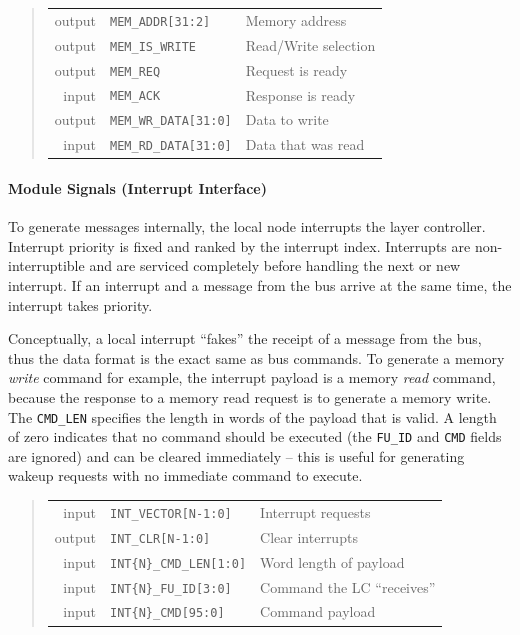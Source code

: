 \begin{quote}
\begin{tabular}{r l l}
  {\sc output} & {\tt MEM\_ADDR[31:2]} & Memory address \\
  {\sc output} & {\tt MEM\_IS\_WRITE} & Read/Write selection \\
  {\sc output} & {\tt MEM\_REQ} & Request is ready \\
  {\sc  input} & {\tt MEM\_ACK} & Response is ready \\
  {\sc output} & {\tt MEM\_WR\_DATA[31:0]} & Data to write \\
  {\sc  input} & {\tt MEM\_RD\_DATA[31:0]} & Data that was read \\
\end{tabular}
\end{quote}

\paragraph{Module Signals (Interrupt Interface)}
To generate messages internally, the local node interrupts the layer
controller. Interrupt priority is fixed and ranked by the interrupt index.
Interrupts are non-interruptible and are serviced completely before handling
the next or new interrupt. If an interrupt and a message from the bus arrive
at the same time, the interrupt takes priority.

Conceptually, a local interrupt ``fakes'' the receipt of a message from the
bus, thus the data format is the exact same as bus commands. To generate a
memory {\em write} command for example, the interrupt payload is a memory {\em
read} command, because the response to a memory read request is to generate a
memory write. The \texttt{CMD\_LEN} specifies the length in words of the
payload that is valid. A length of zero indicates that no command should be
executed (the \texttt{FU\_ID} and \texttt{CMD} fields are ignored) and can be
cleared immediately -- this is useful for generating wakeup requests with no
immediate command to execute.

\begin{quote}
\begin{tabular}{r l l}
  {\sc  input} & {\tt INT\_VECTOR[N-1:0]} & Interrupt requests \\
  {\sc output} & {\tt INT\_CLR[N-1:0]} & Clear interrupts \\
  {\sc  input} & {\tt INT\{N\}\_CMD\_LEN[1:0]} & Word length of payload \\
  {\sc  input} & {\tt INT\{N\}\_FU\_ID[3:0]} & Command the LC ``receives'' \\
  {\sc  input} & {\tt INT\{N\}\_CMD[95:0]} & Command payload \\
\end{tabular}
\end{quote}


